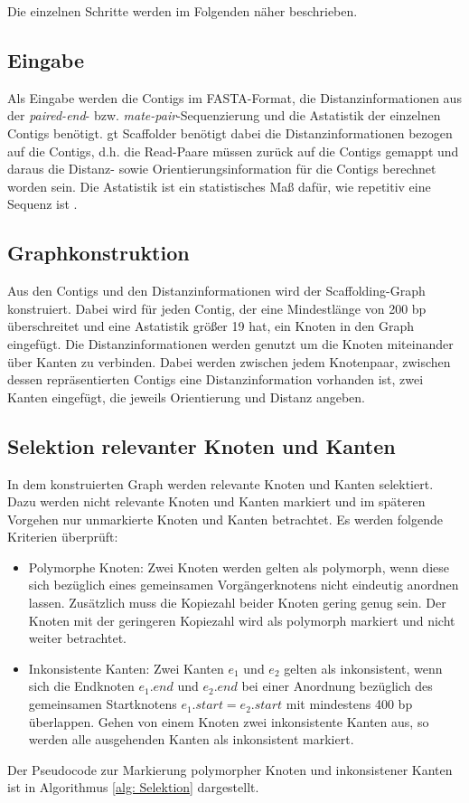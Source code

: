 \documentclass[a4paper,10pt,parskip]{scrartcl}
\begin{document}
Die einzelnen Schritte werden im Folgenden näher
beschrieben.

\subsection{Eingabe}
Als Eingabe werden die Contigs im FASTA-Format, die
Distanzinformationen aus der \textit{paired-end}-
bzw. \textit{mate-pair}-Sequenzierung und die Astatistik der einzelnen
Contigs benötigt. gt Scaffolder benötigt dabei die
Distanzinformationen bezogen auf die Contigs, d.h. die Read-Paare
müssen zurück auf die Contigs gemappt und daraus die Distanz- sowie
Orientierungsinformation für die Contigs berechnet worden sein. Die
Astatistik ist ein statistisches Maß dafür, wie repetitiv eine Sequenz
ist \cite{Myers:2005iq}.

\subsection{Graphkonstruktion}
Aus den Contigs und den Distanzinformationen wird der
Scaffolding-Graph konstruiert. Dabei wird für jeden Contig, der eine
Mindestlänge von 200 bp überschreitet und eine Astatistik größer 19
hat, ein Knoten in den Graph eingefügt. Die Distanzinformationen
werden genutzt um die Knoten miteinander über Kanten zu
verbinden. Dabei werden zwischen jedem Knotenpaar, zwischen dessen
repräsentierten Contigs eine Distanzinformation vorhanden ist, zwei
Kanten eingefügt, die jeweils Orientierung und Distanz angeben.

\subsection{Selektion relevanter Knoten und Kanten}
In dem konstruierten Graph werden relevante Knoten und Kanten
selektiert. Dazu werden nicht relevante Knoten und Kanten markiert und
im späteren Vorgehen nur unmarkierte Knoten und Kanten betrachtet. Es
werden folgende Kriterien überprüft:
\begin{itemize}
\item Polymorphe Knoten: Zwei Knoten werden gelten als polymorph, wenn
  diese sich bezüglich eines gemeinsamen Vorgängerknotens nicht
  eindeutig anordnen lassen. Zusätzlich muss die Kopiezahl beider
  Knoten gering genug sein. Der Knoten mit der geringeren Kopiezahl
  wird als polymorph markiert und nicht weiter betrachtet.
\item Inkonsistente Kanten: Zwei Kanten $e_1$ und $e_2$ gelten als
  inkonsistent, wenn sich die Endknoten $e_1.end$ und $e_2.end$ bei
  einer Anordnung bezüglich des gemeinsamen Startknotens $e_1.start =
  e_2.start$ mit mindestens 400 bp überlappen. Gehen von einem Knoten
  zwei inkonsistente Kanten aus, so werden alle ausgehenden Kanten als
  inkonsistent markiert.
\end{itemize}
Der Pseudocode zur Markierung polymorpher Knoten und inkonsistener
Kanten ist in Algorithmus \ref{alg: Selektion} dargestellt.
\end{document}
